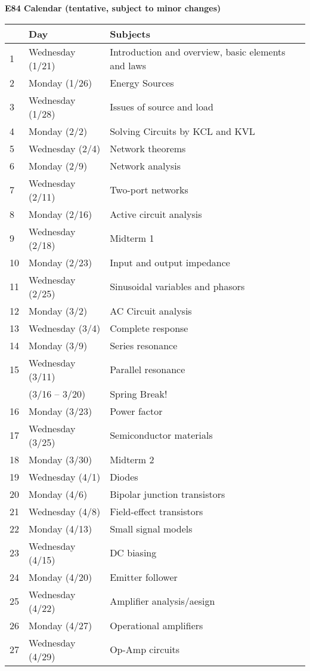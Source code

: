 \usepackage{html}
\textwidth 6.0in
\topmargin -0.5in
\oddsidemargin -0in
\evensidemargin -0.5in


{\bf \large E84 Calendar (tentative, subject to minor changes)}

\begin{tabular}{l|l|l}\hline
  & {\bf Day} & {\bf Subjects} \\ \hline
1 & Wednesday (1/21) & Introduction and overview, basic elements and laws \\
2 & Monday (1/26) & Energy Sources \\
3 & Wednesday (1/28) & Issues of source and load \\
4 & Monday (2/2) & Solving Circuits by KCL and KVL \\
5 & Wednesday (2/4) & Network theorems \\
6 & Monday (2/9) & Network analysis \\
7 & Wednesday (2/11) & Two-port networks  \\
8 & Monday (2/16) & Active circuit analysis \\
9 & Wednesday (2/18) & Midterm 1 \\
10& Monday (2/23) & Input and output impedance \\
11& Wednesday (2/25) & Sinusoidal variables and phasors \\
12& Monday (3/2) & AC Circuit analysis  \\
13& Wednesday (3/4) & Complete response \\
14& Monday (3/9) & Series resonance \\
15& Wednesday (3/11) & Parallel resonance \\
  & (3/16 -- 3/20) & Spring Break! \\
16& Monday (3/23) & Power factor \\
17& Wednesday (3/25) & Semiconductor materials \\
18& Monday (3/30) & Midterm 2 \\
19& Wednesday (4/1) & Diodes \\
20& Monday (4/6) & Bipolar junction transistors \\
21& Wednesday (4/8) & Field-effect transistors \\
22& Monday (4/13) & Small signal models \\ 
23& Wednesday (4/15) & DC biasing \\ 
24& Monday (4/20) & Emitter follower \\
25& Wednesday (4/22) & Amplifier analysis/aesign \\
26& Monday (4/27) & Operational amplifiers \\
27& Wednesday (4/29) & Op-Amp circuits \\
\end{tabular}



